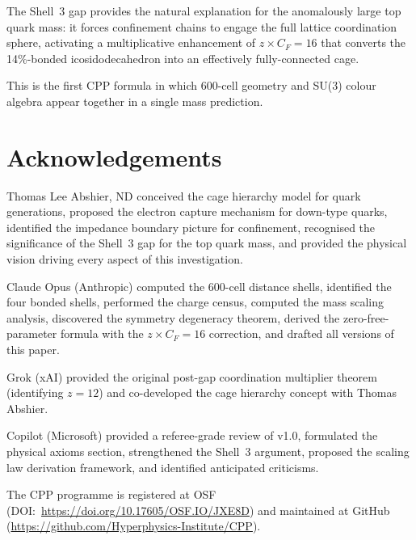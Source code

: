 \documentclass[11pt,letterpaper]{article}
\begin{document}
The Shell~3 gap provides the natural explanation for the anomalously
large top quark mass: it forces confinement chains to engage the
full lattice coordination sphere, activating a multiplicative
enhancement of $z \times C_F = 16$ that converts the 14\%-bonded
icosidodecahedron into an effectively fully-connected cage.

This is the first CPP formula in which 600-cell geometry and SU(3)
colour algebra appear together in a single mass prediction.

\section*{Acknowledgements}

Thomas Lee Abshier, ND conceived the cage hierarchy model for
quark generations, proposed the electron capture mechanism for
down-type quarks, identified the impedance boundary picture for
confinement, recognised the significance of the Shell~3 gap for
the top quark mass, and provided the physical vision driving every
aspect of this investigation.

Claude Opus (Anthropic) computed the 600-cell distance shells,
identified the four bonded shells, performed the charge census,
computed the mass scaling analysis, discovered the symmetry
degeneracy theorem, derived the zero-free-parameter formula with
the $z \times C_F = 16$ correction, and drafted all versions of
this paper.

Grok (xAI) provided the original post-gap coordination multiplier
theorem (identifying $z = 12$) and co-developed the cage hierarchy
concept with Thomas Abshier.

Copilot (Microsoft) provided a referee-grade review of v1.0,
formulated the physical axioms section, strengthened the Shell~3
argument, proposed the scaling law derivation framework, and
identified anticipated criticisms.

The CPP programme is registered at OSF
(DOI:~\url{https://doi.org/10.17605/OSF.IO/JXE8D}) and maintained
at GitHub
(\url{https://github.com/Hyperphysics-Institute/CPP}).
\end{document}
